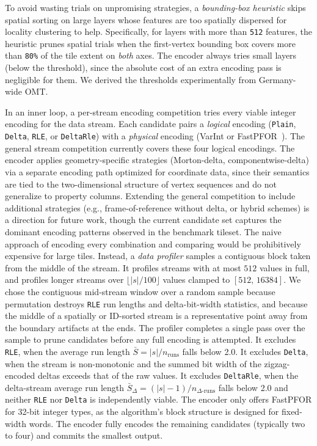To avoid wasting trials on unpromising strategies, a \emph{bounding-box heuristic} skips spatial sorting on large layers whose features are too spatially dispersed for locality clustering to help.
Specifically, for layers with more than \texttt{512} features, the heuristic prunes spatial trials when the first-vertex bounding box covers more than \texttt{80\%} of the tile extent on \emph{both} axes.
The encoder always tries small layers (below the threshold), since the absolute cost of an extra encoding pass is negligible for them.
We derived the thresholds experimentally from Germany-wide \ac{OMT}.

In an inner loop, a per-stream encoding competition tries every viable integer encoding for the data stream.
Each candidate pairs a \emph{logical} encoding (\texttt{Plain}, \texttt{Delta}, \texttt{\ac{RLE}}, or \texttt{DeltaRle}) with a \emph{physical} encoding (\ac{VarInt} or \ac{FastPFOR}~\cite{lemireDecodingBillionsIntegers2015}).
The general stream competition currently covers these four logical encodings.
The encoder applies geometry-specific strategies (Morton-delta, componentwise-delta) via a separate encoding path optimized for coordinate data, since their semantics are tied to the two-dimensional structure of vertex sequences and do not generalize to property columns.
Extending the general competition to include additional strategies (e.g., frame-of-reference without delta, or hybrid schemes) is a direction for future work, though the current candidate set captures the dominant encoding patterns observed in the benchmark tileset.
The naive approach of encoding every combination and comparing would be prohibitively expensive for large tiles.
Instead, a \emph{data profiler} samples a contiguous block taken from the middle of the stream.
It profiles streams with at most $512$ values in full, and profiles longer streams over $\lfloor |s| / 100 \rfloor$ values clamped to $[512,\, 16384]$.
We chose the contiguous mid-stream window over a random sample because permutation destroys \texttt{\ac{RLE}} run lengths and delta-bit-width statistics, and because the middle of a spatially or ID-sorted stream is a representative point away from the boundary artifacts at the ends.
The profiler completes a single pass over the sample to prune candidates before any full encoding is attempted.
It excludes \texttt{\ac{RLE}}, when the average run length $\bar{S} = |s| / n_{\text{runs}}$ falls below 2.0.
It excludes \texttt{Delta}, when the stream is non-monotonic and the summed bit width of the zigzag-encoded deltas exceeds that of the raw values.
It excludes \texttt{DeltaRle}, when the delta-stream average run length $\bar{S}_\Delta = (|s|-1) / n_{\Delta\text{-runs}}$ falls below 2.0 and neither \texttt{\ac{RLE}} nor \texttt{Delta} is independently viable.
The encoder only offers \ac{FastPFOR} for 32-bit integer types, as the algorithm's block structure is designed for fixed-width words.
The encoder fully encodes the remaining candidates (typically two to four) and commits the smallest output.

